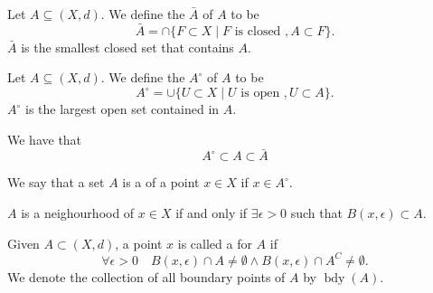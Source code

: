 \documentclass[notoc,notitlepage]{tufte-book}
\DeclareMathOperator{\bdy}{bdy }
\begin{document}
\begin{defn}[Closure]\label{defn:closure}
  Let $A \subseteq (X, d)$. We define the  $\bar{A}$ of $A$ to be
  \begin{equation*}
    \bar{A} = \cap \{ F \subset X \mid F \text{ is closed }, A \subset F \}.
  \end{equation*}
  $\bar{A}$ is the smallest closed set that contains $A$.
\end{defn}

\begin{defn}[Interior]\label{defn:interior}
  Let $A \subseteq (X, d)$. We define the  $A^\circ$ of $A$ to be
  \begin{equation*}
    A^\circ = \cup \{ U \subset X \mid U \text{ is open }, U \subset A \}.
  \end{equation*}
  $A^\circ$ is the largest open set contained in $A$.
\end{defn}

\begin{remark}
  We have that
  \begin{equation*}
    A^\circ \subset A \subset \bar{A}
  \end{equation*}
\end{remark}

\begin{defn}[Neighbourhood]\label{defn:neighbourhood}
  We say that a set $A$ is a  of a point $x \in X$ if $x \in A^\circ$.
\end{defn}

\begin{note}
  $A$ is a neighourhood of $x \in X$ if and only if $\exists \epsilon > 0$ such that $B(x, \epsilon) \subset A$.
\end{note}

\begin{defn}\label{defn:boundary_point}
  Given $A \subset (X, d)$, a point $x$ is called a  for $A$ if
  \begin{equation*}
    \forall \epsilon > 0 \quad B(x, \epsilon) \cap A \neq \emptyset \land B(x, \epsilon) \cap A^C \neq \emptyset.
  \end{equation*}
  We denote the collection of all boundary points of $A$ by $\bdy(A)$.
\end{defn}
\end{document}
